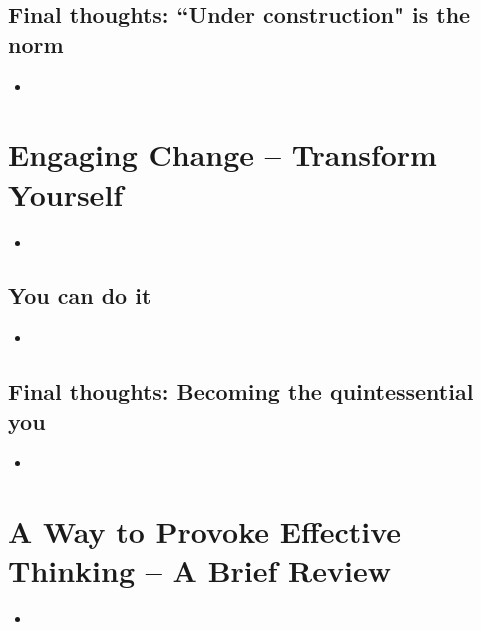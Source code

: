 \documentclass[11pt]{article}
\begin{document}
\subsection{Final thoughts: ``Under construction" is the norm}
\begin{itemize}
\item
\end{itemize}

\section{Engaging Change -- Transform Yourself}
\begin{itemize}
\item
\end{itemize}

\subsection{You can do it}
\begin{itemize}
\item
\end{itemize}

\subsection{Final thoughts: Becoming the quintessential you}
\begin{itemize}
\item
\end{itemize}


\section{A Way to Provoke Effective Thinking -- A Brief Review}
\begin{itemize}
\item
\end{itemize}

\newpage


\end{document}

